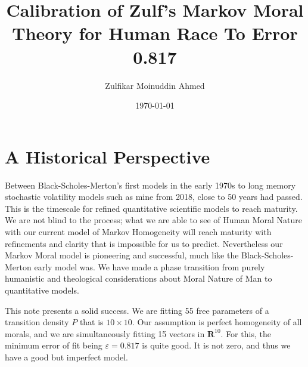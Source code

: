 \documentclass{amsart}
\title{Calibration of Zulf's Markov Moral Theory for Human Race To Error 0.817}
\author{Zulfikar Moinuddin Ahmed}
\date{\today}
\begin{document}
\maketitle

\section{A Historical Perspective}
Between Black-Scholes-Merton's first models in the early 1970s to long memory stochastic volatility models such as mine from 2018, close to 50 years had passed. This is the timescale for refined quantitative scientific models to reach maturity.  We are not blind to the process; what we are able to see of Human Moral Nature with our current model of Markov Homogeneity will reach maturity with refinements and clarity that is impossible for us to predict.  Nevertheless our Markov Moral model is pioneering and successful, much like the Black-Scholes-Merton early model was.  We have made a phase transition from purely humanistic and theological considerations about Moral Nature of Man to quantitative models.  

This note presents a solid success.  We are fitting 55 free parameters of a transition density $P$ that is $10 \times 10$.  Our assumption is perfect homogeneity of all morals, and we are simultaneously fitting 15 vectors in $\mathbf{R}^{10}$.  For this, the minimum error of fit being $\varepsilon=0.817$ is quite good.  It is not zero, and thus we have a good but imperfect model.  
\end{document}

